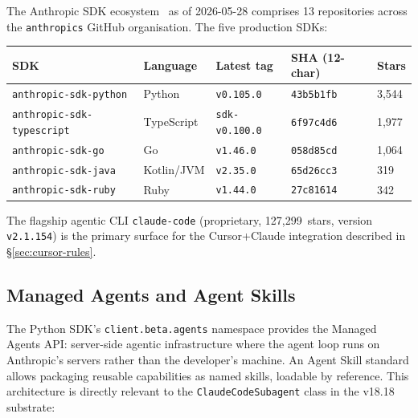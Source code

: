 The Anthropic SDK ecosystem~\cite{anthropic_sdk_deep} as of 2026-05-28
comprises 13 repositories across the \texttt{anthropics} GitHub organisation.
The five production SDKs:

\begin{center}
\begin{tabular}{lllll}
\textbf{SDK} & \textbf{Language} & \textbf{Latest tag} & \textbf{SHA (12-char)} & \textbf{Stars} \\
\hline
\texttt{anthropic-sdk-python} & Python & \texttt{v0.105.0} & \texttt{43b5b1fb} & 3,544 \\
\texttt{anthropic-sdk-typescript} & TypeScript & \texttt{sdk-v0.100.0} & \texttt{6f97c4d6} & 1,977 \\
\texttt{anthropic-sdk-go} & Go & \texttt{v1.46.0} & \texttt{058d85cd} & 1,064 \\
\texttt{anthropic-sdk-java} & Kotlin/JVM & \texttt{v2.35.0} & \texttt{65d26cc3} & 319 \\
\texttt{anthropic-sdk-ruby} & Ruby & \texttt{v1.44.0} & \texttt{27c81614} & 342 \\
\end{tabular}
\end{center}

The flagship agentic CLI \texttt{claude-code} (proprietary, 127,299~stars,
version \texttt{v2.1.154}) is the primary surface for the Cursor+Claude
integration described in \S\ref{sec:cursor-rules}.

\subsection{Managed Agents and Agent Skills}
\label{ssec:managed-agents}

The Python SDK's \texttt{client.beta.agents} namespace provides the Managed
Agents API: server-side agentic infrastructure where the agent loop runs on
Anthropic's servers rather than the developer's machine.  An Agent Skill
standard allows packaging reusable capabilities as named skills, loadable
by reference.  This architecture is directly relevant to the
\texttt{ClaudeCodeSubagent} class in the v18.18 substrate:

